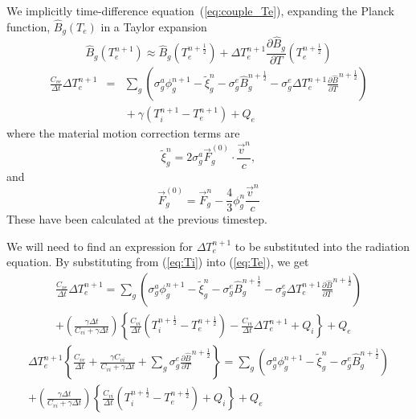 \documentclass[12pt]{article}
\newcommand{\partl}[2]{\ensuremath{\frac{\partial{#1}}{\partial{#2}}}}\newcommand{\del}{\ensuremath{\vec{\nabla}}}
\newcommand{\dt}{\ensuremath{\Delta t}}
\newcommand{\cviOdt}{\ensuremath{\frac{C_{vi}}{\dt}}}
\newcommand{\cveOdt}{\ensuremath{\frac{C_{ve}}{\dt}}}
\newcommand{\Bg}{\ensuremath{\hat{B}_{g}}}
\newcommand{\Bgnphlf}{\ensuremath{\hat{B}_{g}^{n+\frac{1}{2}}}}
\newcommand{\pBgnphlfdT}{\ensuremath{\frac{\partial\hat{B}}{\partial T}^{n+\frac{1}{2}}}}
\begin{document}
We implicitly time-difference equation~(\ref{eq:couple_Te}),
expanding the Planck function,
$\Bg(T_{e})$ in a Taylor expansion
\begin{equation}
        \Bg(T_{e}^{n+1}) \approx \Bg(T_{e}^{n+\frac{1}{2}})
                 + \Delta T_{e}^{n+1} \partl{\Bg}{T}(T_{e}^{n+\frac{1}{2}})
\end{equation}
\begin{eqnarray}
        \cveOdt \Delta T_{e}^{n+1} &=&
                \sum_{g} \left(
                        \sigma_{g}^{a} \phi_{g}^{n+1} - \tilde{\xi}_{g}^{n}
                        - \sigma_{g}^{e} \Bgnphlf
                        - \sigma_{g}^{e} \Delta T_{e}^{n+1} \pBgnphlfdT 
                        \right) \nonumber \\
                & & \mbox{} + \gamma (T_{i}^{n+1} - T_{e}^{n+1}) + Q_{e}
\label{eq:Te}
\end{eqnarray}
where the material motion correction terms are
\begin{equation}
        \tilde{\xi}_{g}^{n} = 2 \sigma_{g}^{a} \vec{F}_{g}^{(0)} \cdot
                                \frac{\vec{v}^{n}}{c}, 
\label{eq:tilde_xi}
\end{equation}
and
\begin{equation}
        \vec{F}_{g}^{(0)} = \vec{F}_{g}^{n} - \frac{4}{3} \phi_{g}^{n}
                                                \frac{\vec{v}^{n}}{c}
\end{equation}
These have been calculated at the previous timestep.

We will need to find an expression for $\Delta T_{e}^{n+1}$ to be
substituted into the radiation equation.
By substituting from (\ref{eq:Ti}) into (\ref{eq:Te}), we get
\begin{multline}
        \cveOdt \Delta T_{e}^{n+1} =
                \sum_{g} \left(
                        \sigma_{g}^{a} \phi_{g}^{n+1} - \tilde{\xi}_{g}^{n}
                        - \sigma_{g}^{e} \Bgnphlf
                        - \sigma_{g}^{e} \Delta T_{e}^{n+1} \pBgnphlfdT 
                        \right)
        \\
                         + \left(\frac{\gamma\dt}{C_{vi} + 
                                        \gamma \dt} \right)
                        \left\{\cviOdt(T_{i}^{n+\frac{1}{2}}-T_{e}^{n+\frac{1}{2}})
                                 - \cviOdt \Delta T_{e}^{n+1}
                        + Q_{i} \right\}
                        + Q_{e}
\end{multline}
\begin{multline}
        \Delta T_{e}^{n+1} \left\{ \cveOdt +
                \frac{\gamma C_{vi}}{C_{vi} + \gamma \dt } +
                \sum_{g} \sigma_{g}^{e} \pBgnphlfdT \right\} =
                   \sum_{g} \left( \sigma_{g}^{a} \phi_{g}^{n+1} - 
                        \tilde{\xi}_{g}^{n} - \sigma_{g}^{e} \Bgnphlf \right)
        \\
                  +  \left(\frac{\gamma\dt}{C_{vi} + 
                                        \gamma \dt} \right)
                        \left\{\cviOdt(T_{i}^{n+\frac{1}{2}}-T_{e}^{n+\frac{1}{2}}) + Q_{i} \right\}
                         + Q_{e}
\end{multline}
\end{document}

